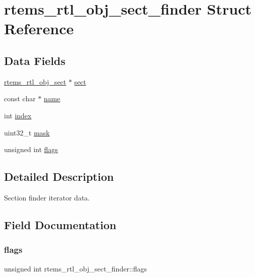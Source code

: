 \hypertarget{structrtems__rtl__obj__sect__finder}{}\section{rtems\+\_\+rtl\+\_\+obj\+\_\+sect\+\_\+finder Struct Reference}
\label{structrtems__rtl__obj__sect__finder}
\subsection*{Data Fields}
\begin{DoxyCompactItemize}
\item 
\mbox{\hyperlink{structrtems__rtl__obj__sect}{rtems\+\_\+rtl\+\_\+obj\+\_\+sect}} $\ast$ \mbox{\hyperlink{structrtems__rtl__obj__sect__finder_a7d2b572e1a5d0f044abea6560c149c7f}{sect}}
\item 
const char $\ast$ \mbox{\hyperlink{structrtems__rtl__obj__sect__finder_a6c4c7350a7156f3280c2810bd88a79b1}{name}}
\item 
int \mbox{\hyperlink{structrtems__rtl__obj__sect__finder_a229f0aa5c51b4dc979bee90a914fd168}{index}}
\item 
uint32\+\_\+t \mbox{\hyperlink{structrtems__rtl__obj__sect__finder_aec20264a6cb7b9141128153c5ffee858}{mask}}
\item 
unsigned int \mbox{\hyperlink{structrtems__rtl__obj__sect__finder_a6f16a5668ee224672258ea818df96cc7}{flags}}
\end{DoxyCompactItemize}


\subsection{Detailed Description}
Section finder iterator data. 

\subsection{Field Documentation}
\mbox{\label{structrtems__rtl__obj__sect__finder_a6f16a5668ee224672258ea818df96cc7}} 
\subsubsection{\texorpdfstring{flags}{flags}}
{\footnotesize\ttfamily unsigned int rtems\+\_\+rtl\+\_\+obj\+\_\+sect\+\_\+finder\+::flags}

